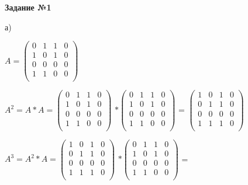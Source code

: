\documentclass{article}
\begin{document}
\newpage
\large
\begin{center}
	\textbf{Задание №1}
\end{center}
\par
а)
\vspace{5mm}
\par \hspace{8mm} $A =
	\begin{pmatrix}
		0 & 1 & 1 & 0 \\
		1 & 0 & 1 & 0 \\
		0 & 0 & 0 & 0 \\
		1 & 1 & 0 & 0 \\
	\end{pmatrix}$
\vspace{5mm}
\par
\hspace{8mm} $A^2 = A * A =
	\begin{pmatrix}
		0 & 1 & 1 & 0 \\
		1 & 0 & 1 & 0 \\
		0 & 0 & 0 & 0 \\
		1 & 1 & 0 & 0 \\
	\end{pmatrix}$
$*\begin{pmatrix}
		0 & 1 & 1 & 0 \\
		1 & 0 & 1 & 0 \\
		0 & 0 & 0 & 0 \\
		1 & 1 & 0 & 0 \\
	\end{pmatrix}$ =
$\begin{pmatrix}
		1 & 0 & 1 & 0 \\
		0 & 1 & 1 & 0 \\
		0 & 0 & 0 & 0 \\
		1 & 1 & 1 & 0 \\
	\end{pmatrix}$
\vspace{5mm}
\par
\hspace{8mm} $A^3 = A^2 * A =
	\begin{pmatrix}
		1 & 0 & 1 & 0 \\
		0 & 1 & 1 & 0 \\
		0 & 0 & 0 & 0 \\
		1 & 1 & 1 & 0 \\
	\end{pmatrix}$
$*\begin{pmatrix}
		0 & 1 & 1 & 0 \\
		1 & 0 & 1 & 0 \\
		0 & 0 & 0 & 0 \\
		1 & 1 & 0 & 0 \\
	\end{pmatrix}$ =
\end{document}
